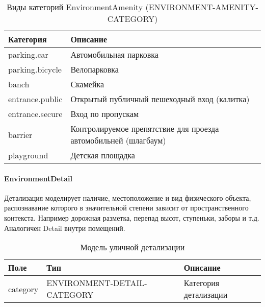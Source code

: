         \begin{center}
          \begin{xltabular}{\linewidth}{|l|X|}
            \caption{Виды категорий EnvironmentAmenity (ENVIRONMENT-AMENITY-CATEGORY)}\\           \hline
            Категория       & Описание                                                        \\\hline
            parking.car     & Автомобильная парковка                                          \\\hline
            parking.bicycle & Велопарковка                                                    \\\hline
            banch           & Скамейка                                                        \\\hline
            entrance.public & Открытый публичный пешеходный вход (калитка)                    \\\hline
            entrance.secure & Вход по пропускам                                               \\\hline
            barrier         & Контролируемое препятствие для проезда автомобильней (шлагбаум) \\\hline
            playground      & Детская площадка                                                \\\hline
          \end{xltabular}
        \end{center}


      \paragraph{EnvironmentDetail}
        Детализация моделирует наличие, местоположение и вид физического объекта, распознавание которого в значительной степени зависит от пространственного контекста. Например дорожная разметка, перепад высот, ступеньки, заборы и т.д. Аналогичен Detail внутри помещений.
        \begin{center}
          \begin{xltabular}{\linewidth}{|l|p{4cm}|X|}
            \caption{Модель уличной детализации}\\\hline
            Поле     & Тип                         & Описание              \\ \hline
            category & ENVIRONMENT-DETAIL-CATEGORY & Категория детализации \\ \hline
          \end{xltabular}
        \end{center}

